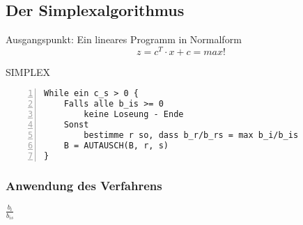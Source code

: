 \subsection{Der Simplexalgorithmus}
Ausgangspunkt: Ein lineares Programm in Normalform
\[z = c^T \cdot x + c = max!\]

SIMPLEX
\begin{lstlisting}[frame=single,numbers=left]
While ein c_s > 0 {
	Falls alle b_is >= 0
		keine Loseung - Ende
	Sonst
		bestimme r so, dass b_r/b_rs = max b_i/b_is
	B = AUTAUSCH(B, r, s)
}
\end{lstlisting}

\subsubsection{Anwendung des Verfahrens}
\begin{itemize}
	\Ermittle \(\frac{b_i}{b_{is}}\)
\end{itemize}



